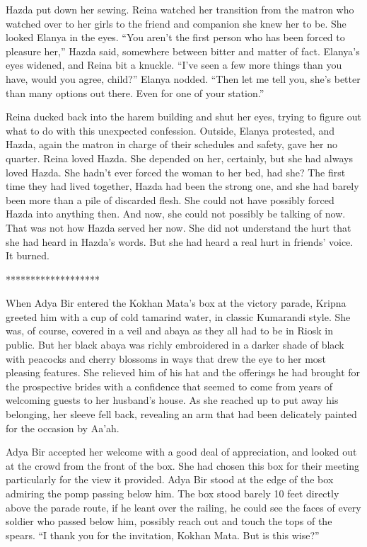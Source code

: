 \documentclass{article}
\begin{document}
	Hazda put down her sewing. Reina watched her transition from the matron who watched over to her girls to the friend and companion she knew her to be. She looked Elanya in the eyes. “You aren’t the first person who has been forced to pleasure her,” Hazda said, somewhere between bitter and matter of fact. Elanya’s eyes widened, and Reina bit a knuckle. “I’ve seen a few more things than you have, would you agree, child?” Elanya nodded. “Then let me tell you, she’s better than many options out there. Even for one of your station.” 
	
	Reina ducked back into the harem building and shut her eyes, trying to figure out what to do with this unexpected confession. Outside, Elanya protested, and Hazda, again the matron in charge of their schedules and safety, gave her no quarter. Reina loved Hazda. She depended on her, certainly, but she had always loved Hazda. She hadn’t ever forced the woman to her bed, had she? The first time they had lived together, Hazda had been the strong one, and she had barely been more than a pile of discarded flesh. She could not have possibly forced Hazda into anything then. And now, she could not possibly be talking of now. That was not how Hazda served her now. She did not understand the hurt that she had heard in Hazda’s words. But she had heard a real hurt in friends’ voice. It burned.
	
	*******************
	
	When Adya Bir entered the Kokhan Mata’s box at the victory parade, Kripna greeted him with a cup of cold tamarind water, in classic Kumarandi style. She was, of course, covered in a veil and abaya as they all had to be in Riosk in public. But her black abaya was richly embroidered in a darker shade of black with peacocks and cherry blossoms in ways that drew the eye to her most pleasing features. She relieved him of his hat and the offerings he had brought for the prospective brides with a confidence that seemed to come from years of welcoming guests to her husband’s house. As she reached up to put away his belonging, her sleeve fell back, revealing an arm that had been delicately painted for the occasion by Aa’ah.
	
	Adya Bir accepted her welcome with a good deal of appreciation, and looked out at the crowd from the front of the box. She had chosen this box for their meeting particularly for the view it provided. Adya Bir stood at the edge of the box admiring the pomp passing below him. The box stood barely 10 feet directly above the parade route, if he leant over the railing, he could see the faces of every soldier who passed below him, possibly reach out and touch the tops of the spears. “I thank you for the invitation, Kokhan Mata. But is this wise?”
	
\end{document}
